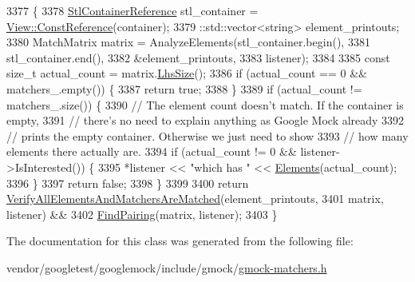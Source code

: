\begin{DoxyCode}
3377                                                                     \{
3378     \hyperlink{classtesting_1_1internal_1_1UnorderedElementsAreMatcherImpl_acf64d0e328361d4796bcf1aeb91ed975}{StlContainerReference} stl\_container = 
      \hyperlink{classtesting_1_1internal_1_1StlContainerView_a36eccf53329730f6e55c12002128bf25}{View::ConstReference}(container);
3379     ::std::vector<string> element\_printouts;
3380     MatchMatrix matrix = AnalyzeElements(stl\_container.begin(),
3381                                          stl\_container.end(),
3382                                          &element\_printouts,
3383                                          listener);
3384 
3385     \textcolor{keyword}{const} \textcolor{keywordtype}{size\_t} actual\_count = matrix.\hyperlink{classtesting_1_1internal_1_1MatchMatrix_ab98f3aa7fd9a536329e495a5016f8d63}{LhsSize}();
3386     \textcolor{keywordflow}{if} (actual\_count == 0 && matchers\_.empty()) \{
3387       \textcolor{keywordflow}{return} \textcolor{keyword}{true};
3388     \}
3389     \textcolor{keywordflow}{if} (actual\_count != matchers\_.size()) \{
3390       \textcolor{comment}{// The element count doesn't match.  If the container is empty,}
3391       \textcolor{comment}{// there's no need to explain anything as Google Mock already}
3392       \textcolor{comment}{// prints the empty container. Otherwise we just need to show}
3393       \textcolor{comment}{// how many elements there actually are.}
3394       \textcolor{keywordflow}{if} (actual\_count != 0 && listener->IsInterested()) \{
3395         *listener << \textcolor{stringliteral}{"which has "} << \hyperlink{classtesting_1_1internal_1_1UnorderedElementsAreMatcherImplBase_ab6d5a2342e07730b913f419cf662d16a}{Elements}(actual\_count);
3396       \}
3397       \textcolor{keywordflow}{return} \textcolor{keyword}{false};
3398     \}
3399 
3400     \textcolor{keywordflow}{return} \hyperlink{classtesting_1_1internal_1_1UnorderedElementsAreMatcherImplBase_a0a12446ecc8fab75a551a77c322e7896}{VerifyAllElementsAndMatchersAreMatched}(element\_printouts,
3401                                                   matrix, listener) &&
3402            \hyperlink{namespacetesting_1_1internal_af2bd2e350b56422a3d9d3b986ac1df0e}{FindPairing}(matrix, listener);
3403   \}
\end{DoxyCode}


The documentation for this class was generated from the following file\+:\begin{DoxyCompactItemize}
\item 
vendor/googletest/googlemock/include/gmock/\hyperlink{gmock-matchers_8h}{gmock-\/matchers.\+h}\end{DoxyCompactItemize}
